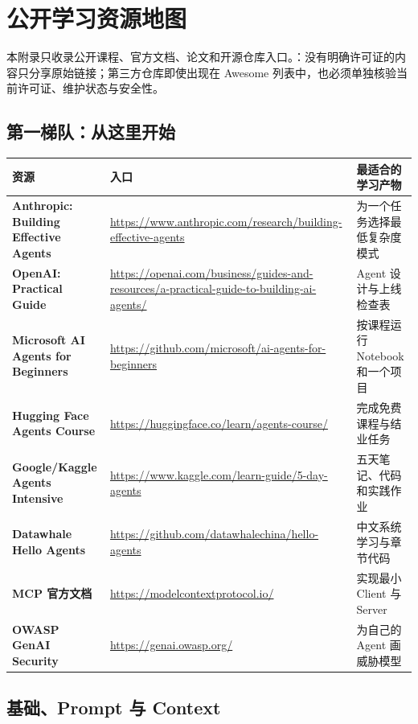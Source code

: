 \chapter{公开学习资源地图}
\label{app:resources}

本附录只收录公开课程、官方文档、论文和开源仓库入口。：没有明确许可证的内容只分享原始链接；第三方仓库即使出现在 Awesome 列表中，也必须单独核验当前许可证、维护状态与安全性。

\section{第一梯队：从这里开始}

\begin{longtable}{>{\bfseries}p{} p{} p{}}
\toprule
资源 & 入口 & 最适合的学习产物 \\
\midrule
Anthropic: Building Effective Agents & \url{https://www.anthropic.com/research/building-effective-agents} & 为一个任务选择最低复杂度模式 \\
OpenAI: Practical Guide & \url{https://openai.com/business/guides-and-resources/a-practical-guide-to-building-ai-agents/} & Agent 设计与上线检查表 \\
Microsoft AI Agents for Beginners & \url{https://github.com/microsoft/ai-agents-for-beginners} & 按课程运行 Notebook 和一个项目 \\
Hugging Face Agents Course & \url{https://huggingface.co/learn/agents-course/} & 完成免费课程与结业任务 \\
Google/Kaggle Agents Intensive & \url{https://www.kaggle.com/learn-guide/5-day-agents} & 五天笔记、代码和实践作业 \\
Datawhale Hello Agents & \url{https://github.com/datawhalechina/hello-agents} & 中文系统学习与章节代码 \\
MCP 官方文档 & \url{https://modelcontextprotocol.io/} & 实现最小 Client 与 Server \\
OWASP GenAI Security & \url{https://genai.owasp.org/} & 为自己的 Agent 画威胁模型 \\
\bottomrule
\end{longtable}

\section{基础、Prompt 与 Context}

